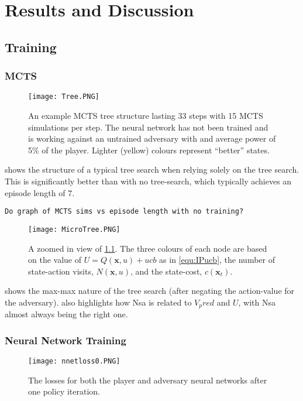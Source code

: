 \documentclass[../main.tex]{subfiles}
\begin{document}
\onlyinsubfile{\tableofcontents{}}
\chapter{Results and Discussion}

\section{Training}
\subsection{MCTS}

\begin{figure}[h]
    \centering
    \texttt{[image: Tree.PNG]}
    \caption{An example MCTS tree structure lasting 33 steps with 15 MCTS simulations per step. The neural network has not been trained and is working against an untrained adversary with and average power of 5\% of the player. Lighter (yellow) colours represent ``better'' states.}
    \label{fig:tree}
\end{figure}

 shows the structure of a typical tree search when relying solely on the tree search. This is significantly better than with no tree-search, which typically achieves an episode length of 7.

\texttt{Do graph of MCTS sims vs episode length with no training?}

\begin{figure}[h]
    \centering
    \texttt{[image: MicroTree.PNG]}
    \caption{A zoomed in view of \cref{fig:tree}. The three colours of each node are based on the value of $U=Q(\boldsymbol{x}, u) + ucb$ as in \cref{equ:IPucb}, the number of state-action visits, $N(\boldsymbol{x}, u)$, and the state-cost, $c(\boldsymbol{x}_t)$.}
    \label{fig:microtree}
\end{figure}

 shows the max-max nature of the tree search (after negating the action-value for the adversary). also highlights how Nsa is related to $V_pred$ and $U$, with Nsa almost always being the right one.

\subsection{Neural Network Training}

\begin{figure}[h]
    \centering
    \texttt{[image: nnetloss0.PNG]}
    \caption{The losses for both the player and adversary neural networks after one policy iteration.}
    \label{fig:nnetlosses0}
\end{figure}
\end{document}
